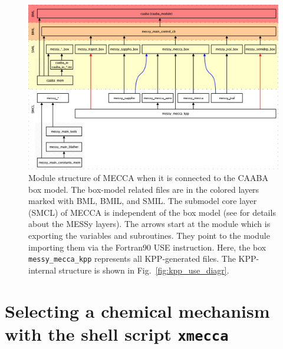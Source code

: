 \documentclass[twoside]{article}
\begin{document}
\begin{figure}
  \begin{center}
    \includegraphics[width=\textwidth]{caaba_use_diagr}
  \end{center}
  \caption{Module structure of MECCA when it is connected to the CAABA
    box model. The box-model related files are in the colored layers
    marked with BML, BMIL, and SMIL. The submodel core layer (SMCL) of
    MECCA is independent of the box model (see \citet{1664} for details
    about the MESSy layers). The arrows start at the module which is
    exporting the variables and subroutines. They point to the module
    importing them via the Fortran90 USE instruction. Here, the box {\tt
      messy\_mecca\_kpp} represents all KPP-generated files. The
    KPP-internal structure is shown in Fig.~\ref{fig:kpp_use_diagr}.}
  \label{fig:caaba_use_diagr}
\end{figure}

\section{Selecting a chemical mechanism with the shell script {\tt xmecca}}
\label{sec:xmecca}
\end{document}

